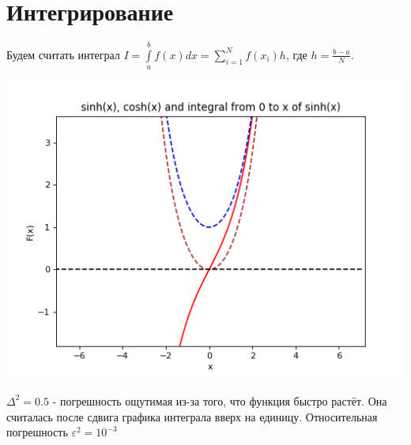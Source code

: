 \documentclass[12pt,a4paper]{scrartcl}
\begin{document}
	\section{Интегрирование}
	Будем считать интеграл $I = \int\limits_a^b f(x)dx =  \sum_{i=1}^N  f({x_i}) h$, где $h = \frac{b-a}{N}$.
	\begin{center}
		\includegraphics[scale=0.73]{figure_9} \\
	\end{center}
	$\Delta^2 = 0.5$ - погрешность ощутимая из-за того, что функция быстро растёт. Она считалась после сдвига графика интеграла вверх на единицу. Относительная погрешность $\varepsilon^2 = 10^{-3}$
\end{document}
